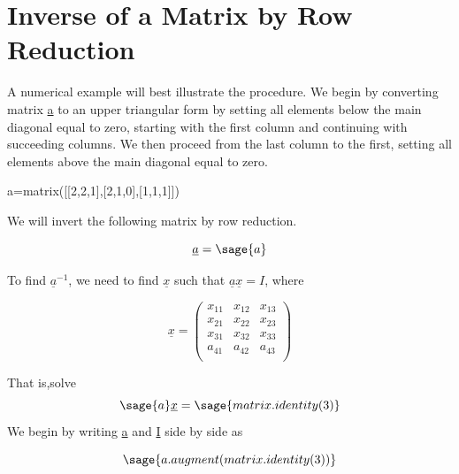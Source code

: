 \documentclass[12pt]{report}
\begin{document}

\section{Inverse of a Matrix by Row Reduction}\label{last}

A numerical example will best illustrate the procedure. We begin by
converting matrix \underline{a} to an upper triangular form by setting
all elements below the main diagonal equal to zero, starting with the
first column and continuing with succeeding columns. We then proceed
from the last column to the first, setting all elements above the main
diagonal equal to zero.

\begin{sagesilent}
	a=matrix([[2,2,1],[2,1,0],[1,1,1]])
\end{sagesilent}
We will invert the following matrix by row reduction.

\begin{equation}
	\underline{a} = \sage{a}
\end{equation}

To find $\underline{a}^{-1}$, we need to find $\underline{x}$ such that
$\underline{a}\underline{x}=I$, where

\begin{equation}
	\underline{x}=\left(\begin{array}{rrr}
	x_{11} & x_{12} & x_{13} \\
	x_{21} & x_{22} & x_{23} \\
	x_{31} & x_{32} & x_{33} \\
	a_{41} & a_{42} & a_{43}  \\
	\end{array}\right)
\end{equation}

That is,solve\begin{equation} \sage{a}\underline{x} = \sage{matrix.identity(3)}\end{equation}
We begin by writing \underline{a} and \underline{I} side by side as

\begin{equation}
	\sage{a.augment(matrix.identity(3))}
	\label{eq:inv1}
\end{equation}
\end{document}
